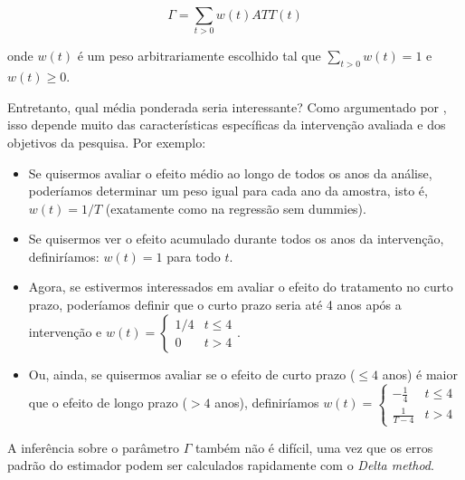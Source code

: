\documentclass[portugues]{article}
\begin{document}
$$ \Gamma = \sum_{t>0} w(t) ATT(t) $$

\noindent onde $w(t)$ é um peso arbitrariamente escolhido tal que $\sum_{t>0} w(t) = 1$ e $w(t) \geq 0$.

Entretanto, qual média ponderada seria interessante? Como argumentado por \cite{callaway2021difference}, isso depende muito das características específicas da intervenção avaliada e dos objetivos da pesquisa. Por exemplo:

\begin{itemize}
    \item Se quisermos avaliar o efeito médio ao longo de todos os anos da análise, poderíamos determinar um peso igual para cada ano da amostra, isto é, $w(t) = 1/T$ (exatamente como na regressão sem dummies).

    \item Se quisermos ver o efeito acumulado durante todos os anos da intervenção, definiríamos: $w(t) = 1$ para todo $t$.
    \item Agora, se estivermos interessados em avaliar o efeito do tratamento no curto prazo, poderíamos definir que o curto prazo seria até 4 anos após a intervenção e $w(t) = \begin{cases}
    1/4 & t \leq 4 \\ 0 & t > 4 
    \end{cases}$.
    \item Ou, ainda, se quisermos avaliar se o efeito de curto prazo ($\leq 4$ anos) é maior que o efeito de longo prazo ($> 4$ anos), definiríamos $w(t) = \begin{cases}
    -\frac{1}{4} & t \leq 4 \\ \frac{1}{T-4}  & t > 4 
    \end{cases}$
\end{itemize}

A inferência sobre o parâmetro $\Gamma$ também não é difícil, uma vez que os erros padrão do estimador podem ser calculados rapidamente com o \textit{Delta method}. %
\end{document}
